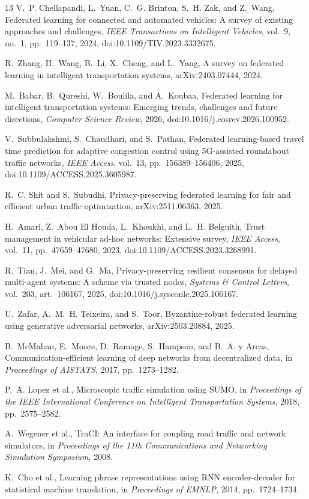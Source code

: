 \cleardoublepage
\renewcommand{\bibname}{KEY REFERENCES}
\begin{thebibliography}{13}
\small
{}
V.~P. Chellapandi, L.~Yuan, C.~G. Brinton, S.~H. Zak, and Z.~Wang,
Federated learning for connected and automated vehicles: A survey of existing approaches and challenges,
\emph{IEEE Transactions on Intelligent Vehicles}, vol.~9, no.~1, pp.~119--137, 2024, doi:10.1109/TIV.2023.3332675.

R.~Zhang, H.~Wang, B.~Li, X.~Cheng, and L.~Yang,
A survey on federated learning in intelligent transportation systems,
arXiv:2403.07444, 2024.

M.~Babar, B.~Qureshi, W.~Boulila, and A.~Koubaa,
Federated learning for intelligent transportation systems: Emerging trends, challenges and future directions,
\emph{Computer Science Review}, 2026, doi:10.1016/j.cosrev.2026.100952.

V.~Subbulakshmi, S.~Chaudhari, and S.~Pathan,
Federated learning-based travel time prediction for adaptive congestion control using 5G-assisted roundabout traffic networks,
\emph{IEEE Access}, vol.~13, pp.~156389--156406, 2025, doi:10.1109/ACCESS.2025.3605987.

R.~C. Shit and S.~Subudhi,
Privacy-preserving federated learning for fair and efficient urban traffic optimization,
arXiv:2511.06363, 2025.

H.~Amari, Z.~Abou El Houda, L.~Khoukhi, and L.~H. Belguith,
Trust management in vehicular ad-hoc networks: Extensive survey,
\emph{IEEE Access}, vol.~11, pp.~47659--47680, 2023, doi:10.1109/ACCESS.2023.3268991.

R.~Tian, J.~Mei, and G.~Ma,
Privacy-preserving resilient consensus for delayed multi-agent systems: A scheme via trusted nodes,
\emph{Systems \& Control Letters}, vol.~203, art.~106167, 2025, doi:10.1016/j.sysconle.2025.106167.

U.~Zafar, A.~M.~H. Teixeira, and S.~Toor,
Byzantine-robust federated learning using generative adversarial networks,
arXiv:2503.20884, 2025.

B.~McMahan, E.~Moore, D.~Ramage, S.~Hampson, and B.~A. y Arcas,
Communication-efficient learning of deep networks from decentralized data,
in \emph{Proceedings of AISTATS}, 2017, pp.~1273--1282.

P.~A. Lopez et al., Microscopic traffic simulation using SUMO,
in \emph{Proceedings of the IEEE International Conference on Intelligent Transportation Systems}, 2018, pp.~2575--2582.

A.~Wegener et al., TraCI: An interface for coupling road traffic and network simulators,
in \emph{Proceedings of the 11th Communications and Networking Simulation Symposium}, 2008.

K.~Cho et al., Learning phrase representations using RNN encoder-decoder for statistical machine translation,
in \emph{Proceedings of EMNLP}, 2014, pp.~1724--1734.
\end{thebibliography}


